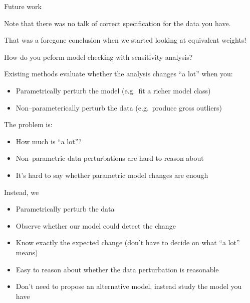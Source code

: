 
\begin{frame}{Future work}

Note that there was no talk of correct specification for the
data you have.

That was a foregone conclusion when we started looking at equivalent weights!

How do you peform model checking with sensitivity analysis?

Existing methods evaluate whether the analysis changes ``a lot'' when you:
%
\begin{itemize}
\item Parametrically perturb the model (e.g.~fit a richer model class)
\item Non--parameterically perturb the data (e.g.~produce gross outliers)
\end{itemize}
%
The problem is:
%
\begin{itemize}
\item How much is ``a lot''?
\item Non--parametric data perturbations are hard to reason about
\item It's hard to say whether parametric model changes are enough
\end{itemize}
%


Instead, we
%
\begin{itemize}
\item Parametrically perturb the data
\item Observe whether our model could detect the change
\end{itemize}
%
\begin{itemize}
\item Know exactly the expected change (don't have to decide on what ``a lot'' means)
\item Easy to reason about whether the data perturbation is reasonable
\item Don't need to propose an alternative model, instead study the model you have
\end{itemize}


\end{frame}





